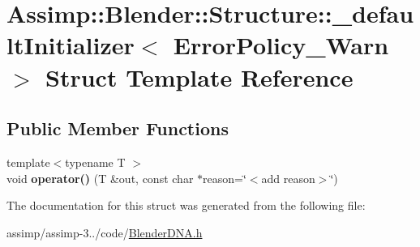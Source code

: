 \hypertarget{struct_assimp_1_1_blender_1_1_structure_1_1__default_initializer_3_01_error_policy___warn_01_4}{\section{Assimp\+:\+:Blender\+:\+:Structure\+:\+:\+\_\+default\+Initializer$<$ Error\+Policy\+\_\+\+Warn $>$ Struct Template Reference}
\label{struct_assimp_1_1_blender_1_1_structure_1_1__default_initializer_3_01_error_policy___warn_01_4}
}
\subsection*{Public Member Functions}
\begin{DoxyCompactItemize}
\item 
\hypertarget{struct_assimp_1_1_blender_1_1_structure_1_1__default_initializer_3_01_error_policy___warn_01_4_a3c5c3056662f67cad65f34541a34d51e}{{\footnotesize template$<$typename T $>$ }\\void {\bfseries operator()} (T \&out, const char $\ast$reason=\char`\"{}$<$add reason$>$\char`\"{})}\label{struct_assimp_1_1_blender_1_1_structure_1_1__default_initializer_3_01_error_policy___warn_01_4_a3c5c3056662f67cad65f34541a34d51e}

\end{DoxyCompactItemize}


The documentation for this struct was generated from the following file\+:\begin{DoxyCompactItemize}
\item 
assimp/assimp-\/3../code/\hyperlink{_blender_d_n_a_8h}{Blender\+D\+N\+A.\+h}\end{DoxyCompactItemize}
